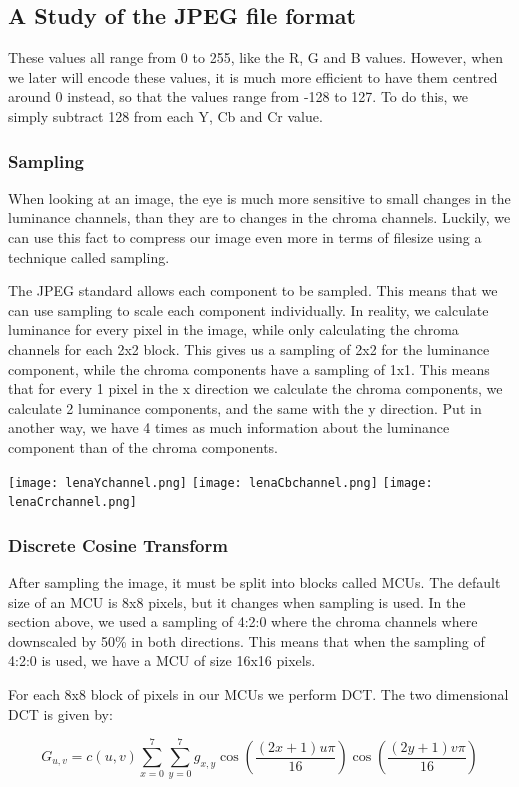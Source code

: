 \begin{infobox}{\section[A Study of the JPEG file format]{A Study of the JPEG file format}}
These values all range from 0 to 255, like the R, G and B values. However, when we later will encode these values, it is much more efficient to have them centred around 0 instead, so that the values range from -128 to 127. To do this, we simply subtract 128 from each Y, Cb and Cr value. 

\subsubsection*{Sampling}
When looking at an image, the eye is much more sensitive to small changes in the luminance channels, than they are to changes in the chroma channels. Luckily, we can use this fact to compress our image even more in terms of filesize using a technique called sampling. 

The JPEG standard allows each component to be sampled. This means that we can use sampling to scale each component individually. In reality, we calculate luminance for every pixel in the image, while only calculating the chroma channels for each 2x2 block. This gives us a sampling of 2x2 for the luminance component, while the chroma components have a sampling of 1x1. This means that for every 1 pixel in the x direction we calculate the chroma components, we calculate 2 luminance components, and the same with the y direction. Put in another way, we have 4 times as much information about the luminance component than of the chroma components.

\begin{centering}
\texttt{[image: lenaYchannel.png]}
\texttt{[image: lenaCbchannel.png]}
\texttt{[image: lenaCrchannel.png]}
\label{fig:YCbCrChannels}
\end{centering}

\subsubsection*{Discrete Cosine Transform}
After sampling the image, it must be split into blocks called MCUs. The default size of an MCU is 8x8 pixels, but it changes when sampling is used. In the section above, we used a sampling of 4:2:0 where the chroma channels where downscaled by 50\% in both directions. This means that when the sampling of 4:2:0 is used, we have a MCU of size 16x16 pixels.

For each 8x8 block of pixels in our MCUs we perform DCT. The two dimensional DCT is given by:

$$ G_{u,v} = c(u,v)\sum_{x=0}^{7}\sum_{y=0}^{7}g_{x,y}\cos{\left(\frac{(2x+1)u\pi}{16}\right)}\cos{\left(\frac{(2y+1)v\pi}{16}\right)} $$


\end{infobox}
